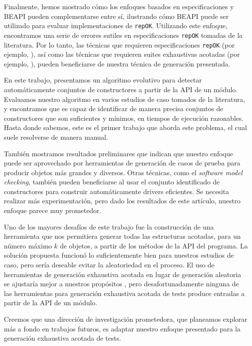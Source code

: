 Finalmente, hemos mostrado cómo los enfoques basados en especificaciones y BEAPI pueden complementarse entre sí, 
ilustrando cómo BEAPI puede ser utilizado para evaluar implementaciones de \texttt{repOK}. Utilizando este enfoque, 
encontramos una serie de errores sutiles en especificaciones \texttt{repOK} tomadas de la literatura. Por lo tanto, 
las técnicas que requieren especificaciones \texttt{repOK} (por ejemplo, \cite{Rosner15}), así como las técnicas que requieren 
suites exhaustivas acotadas (por ejemplo, \cite{Molina+2021}), pueden beneficiarse de nuestra técnica de generación presentada.



En este trabajo, presentamos un algoritmo evolutivo para detectar automáticamente conjuntos de constructores a partir de la API de un módulo. 
Evaluamos nuestro algoritmo en varios estudios de caso tomados de la literatura, y encontramos que es capaz de identificar de manera precisa conjuntos de constructores que son suficientes y mínimos, 
en tiempos de ejecución razonables. Hasta donde sabemos, este es el primer trabajo que aborda este problema, el cual suele resolverse de manera manual.

También mostramos resultados preliminares que indican que nuestro enfoque puede ser aprovechado por herramientas de generación de casos de prueba para producir objetos más grandes y diversos. 
Otras técnicas, como el \emph{software model checking}, también pueden beneficiarse al usar el conjunto identificado de constructores para construir automáticamente drivers eficientes.
Se necesita realizar más experimentación, pero dado los resultados de este artículo, nuestro enfoque parece muy prometedor.

Uno de los mayores desafíos de este trabajo fue la construcción de una herramienta que nos permitiera generar todas las estructuras acotadas, 
para un número máximo $k$ de objetos, a partir de los métodos de la API del programa. La solución propuesta funcionó lo suficientemente bien para nuestros estudios de caso, 
pero sería deseable evitar la aleatoriedad en el proceso. El uso de herramientas de generación exhaustiva acotada en lugar de generación aleatoria se ajustaría mejor a nuestros propósitos \cite{Boyapati02}, 
pero desafortunadamente ninguna de las herramientas para generación exhaustiva acotada de tests produce entradas a partir de la API de un módulo.

Creemos que una dirección de investigación prometedora, que planeamos explorar más a fondo en trabajos futuros, 
es adaptar nuestro enfoque presentado para la generación exhaustiva acotada de tests.

